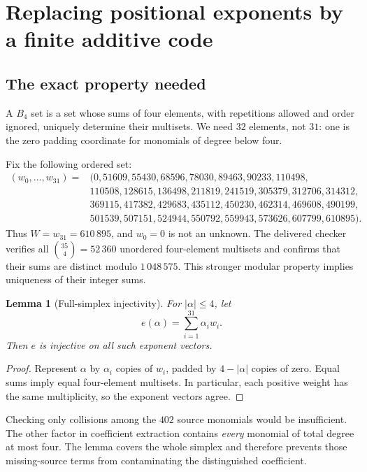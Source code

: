 \documentclass[11pt,letterpaper]{article}
\newtheorem{lemma}[theorem]{Lemma}
\theoremstyle{remark}
\begin{document}
\section{Replacing positional exponents by a finite additive code}
\label{sec:b4}

\subsection{The exact property needed}

A \(B_4\) set is a set whose sums of four elements, with repetitions
allowed and order ignored, uniquely determine their multisets. We need
\(32\) elements, not \(31\): one is the zero padding coordinate for
monomials of degree below four.

Fix the following ordered set:
\begin{equation}
\begin{split}
(w_0,\ldots,w_{31})={}&(
0,51609,55430,68596,78030,89463,90233,110498,\\
&110508,128615,136498,211819,241519,305379,312706,314312,\\
&369115,417382,429683,435112,450230,462314,469608,490199,\\
&501539,507151,524944,550792,559943,573626,607799,610895).
\end{split}
\label{eq:weights}
\end{equation}
Thus \(W=w_{31}=610\,895\), and \(w_0=0\) is not an unknown.
The delivered checker verifies all
\(\binom{35}{4}=52\,360\) unordered four-element multisets and confirms
that their sums are distinct modulo \(1\,048\,575\). This stronger
modular property implies uniqueness of their integer sums.

\begin{lemma}[Full-simplex injectivity]
\label{lem:injectivity}
For \(|\alpha|\le4\), let
\[
e(\alpha)=\sum_{i=1}^{31}\alpha_iw_i.
\]
Then \(e\) is injective on all such exponent vectors.
\end{lemma}
\begin{proof}
Represent \(\alpha\) by \(\alpha_i\) copies of \(w_i\), padded by
\(4-|\alpha|\) copies of zero. Equal sums imply equal four-element
multisets. In particular, each positive weight has the same
multiplicity, so the exponent vectors agree.
\end{proof}

Checking only collisions among the \(402\) source monomials would be
insufficient. The other factor in coefficient extraction contains
\emph{every} monomial of total degree at most four. The lemma covers the
whole simplex and therefore prevents those missing-source terms from
contaminating the distinguished coefficient.
\end{document}
